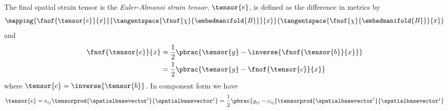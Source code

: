 The final spatial strain tensor is the \emph{Euler-Almansi strain tensor},
$\tensor{e}$, is defined as the difference in metrics
by
\begin{equation}
  \mapping{\fnof{\tensor{e}}{x}}{\tangentspace{\fnof{\chi}{\embedmanifold{B}}}{x}}{\tangentspace{\fnof{\chi}{\embedmanifold{B}}}{x}}
\end{equation}
and
\begin{equation}
  \begin{split}
    \fnof{\tensor{e}}{x}&=\frac{1}{2}\pbrac{\tensor{g}-\inverse{\fnof{\tensor{b}}{x}}}\\
    &= \frac{1}{2}\pbrac{\tensor{g}-\fnof{\tensor{c}}{x}}
  \end{split}
\end{equation}
where $\tensor{c}=\inverse{\tensor{b}}$. In component form we have
\begin{equation}
  \tensor{e}=e_{ij}\tensorprod{\spatialbasevector^{i}}{\spatialbasevector^{j}}=\frac{1}{2}\pbrac{g_{ij}-c_{ij}}\tensorprod{\spatialbasevector^{i}}{\spatialbasevector^{j}}
\end{equation}

